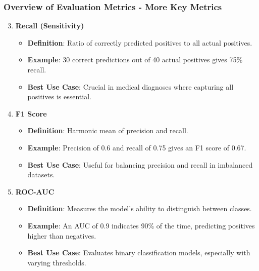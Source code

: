 \documentclass[aspectratio=169]{beamer}
\begin{document}
\begin{frame}[fragile]
    \frametitle{Overview of Evaluation Metrics - More Key Metrics}
    \begin{enumerate}
        \setcounter{enumi}{2}
        \item \textbf{Recall (Sensitivity)}
        \begin{itemize}
            \item \textbf{Definition}: Ratio of correctly predicted positives to all actual positives.
            \item \textbf{Example}: 30 correct predictions out of 40 actual positives gives 75\% recall.
            \item \textbf{Best Use Case}: Crucial in medical diagnoses where capturing all positives is essential.
        \end{itemize}
        
        \item \textbf{F1 Score}
        \begin{itemize}
            \item \textbf{Definition}: Harmonic mean of precision and recall.
            \item \textbf{Example}: Precision of 0.6 and recall of 0.75 gives an F1 score of 0.67.
            \item \textbf{Best Use Case}: Useful for balancing precision and recall in imbalanced datasets.
        \end{itemize}
        
        \item \textbf{ROC-AUC}
        \begin{itemize}
            \item \textbf{Definition}: Measures the model's ability to distinguish between classes.
            \item \textbf{Example}: An AUC of 0.9 indicates 90\% of the time, predicting positives higher than negatives.
            \item \textbf{Best Use Case}: Evaluates binary classification models, especially with varying thresholds.
        \end{itemize}
    \end{enumerate}
\end{frame}
\end{document}
